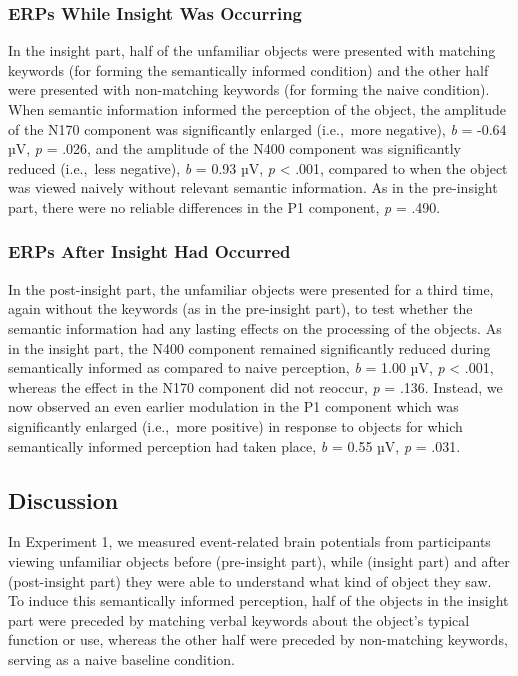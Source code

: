 \documentclass[
  english,
  doc,12pt,twoside,floatsintext]{apa7}
\begin{document}
\hypertarget{erps-while-insight-was-occurring}{%
\subsubsection{ERPs While Insight Was Occurring}\label{erps-while-insight-was-occurring}}

In the insight part, half of the unfamiliar objects were presented with matching keywords (for forming the semantically informed condition) and the other half were presented with non-matching keywords (for forming the naive condition). When semantic information informed the perception of the object, the amplitude of the N170 component was significantly enlarged (i.e.,~more negative), \emph{b} = -0.64 µV, \emph{p} = .026, and the amplitude of the N400 component was significantly reduced (i.e.,~less negative), \emph{b} = 0.93 µV, \emph{p} \textless{} .001, compared to when the object was viewed naively without relevant semantic information. As in the pre-insight part, there were no reliable differences in the P1 component, \emph{p} = .490.

\hypertarget{erps-after-insight-had-occurred}{%
\subsubsection{ERPs After Insight Had Occurred}\label{erps-after-insight-had-occurred}}

In the post-insight part, the unfamiliar objects were presented for a third time, again without the keywords (as in the pre-insight part), to test whether the semantic information had any lasting effects on the processing of the objects. As in the insight part, the N400 component remained significantly reduced during semantically informed as compared to naive perception, \emph{b} = 1.00 µV, \emph{p} \textless{} .001, whereas the effect in the N170 component did not reoccur, \emph{p} = .136. Instead, we now observed an even earlier modulation in the P1 component which was significantly enlarged (i.e.,~more positive) in response to objects for which semantically informed perception had taken place, \emph{b} = 0.55 µV, \emph{p} = .031.

\hypertarget{discussion}{%
\subsection{Discussion}\label{discussion}}

In Experiment 1, we measured event-related brain potentials from participants viewing unfamiliar objects before (pre-insight part), while (insight part) and after (post-insight part) they were able to understand what kind of object they saw. To induce this semantically informed perception, half of the objects in the insight part were preceded by matching verbal keywords about the object's typical function or use, whereas the other half were preceded by non-matching keywords, serving as a naive baseline condition.
\end{document}

